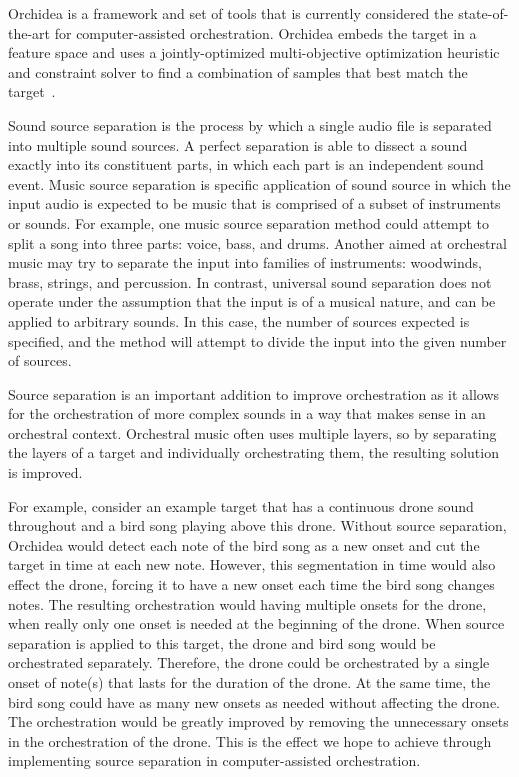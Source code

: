 \documentclass{article}
\begin{document}
	 Orchidea is a framework and set of tools that is currently considered the state-of-the-art for computer-assisted orchestration. Orchidea embeds the target in a feature space and uses a jointly-optimized multi-objective optimization heuristic and constraint solver to find a combination of samples that best match the target~\cite{Cella18, Cella2020}.
		
	Sound source separation is the process by which a single audio file is separated into multiple sound sources. A perfect separation is able to dissect a sound exactly into its constituent parts, in which each part is an independent sound event. Music source separation is specific application of sound source in which the input audio is expected to be music that is comprised of a subset of instruments or sounds. For example, one music source separation method could attempt to split a song into three parts: voice, bass, and drums. Another aimed at orchestral music may try to separate the input into families of instruments: woodwinds, brass, strings, and percussion. In contrast, universal sound separation does not operate under the assumption that the input is of a musical nature, and can be applied to arbitrary sounds. In this case, the number of sources expected is specified, and the method will attempt to divide the input into the given number of sources.		
		
	Source separation is an important addition to improve orchestration as it allows for the orchestration of more complex sounds in a way that makes sense in an orchestral context. Orchestral music often uses multiple layers, so by separating the layers of a target and individually orchestrating them, the resulting solution is improved. 
		
	For example, consider an example target that has a continuous drone sound throughout and a bird song playing above this drone. Without source separation, Orchidea would detect each note of the bird song as a new onset and cut the target in time at each new note. However, this segmentation in time would also effect the drone, forcing it to have a new onset each time the bird song changes notes. The resulting orchestration would having multiple onsets for the drone, when really only one onset is needed at the beginning of the drone. When source separation is applied to this target, the drone and bird song would be orchestrated separately. Therefore, the drone could be orchestrated by a single onset of note(s) that lasts for the duration of the drone. At the same time, the bird song could have as many new onsets as needed without affecting the drone. The orchestration would be greatly improved by removing the unnecessary onsets in the orchestration of the drone. This is the effect we hope to achieve through implementing source separation in computer-assisted orchestration.
		
\end{document}
